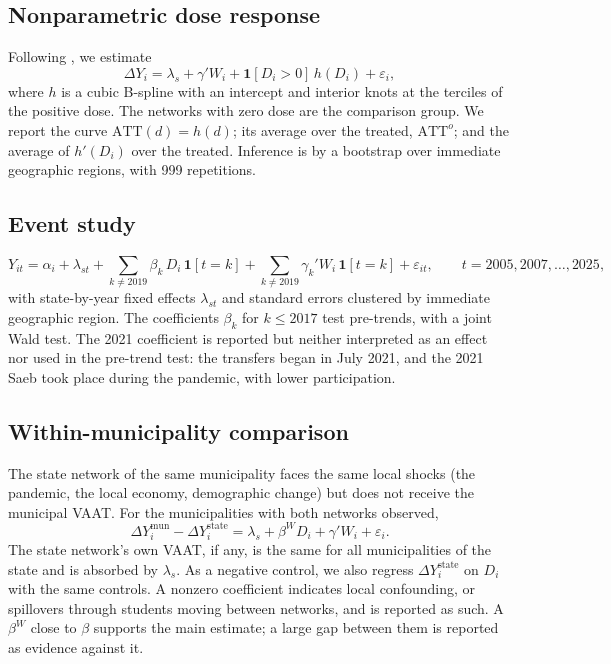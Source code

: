 \documentclass[11pt]{article}
\begin{document}
\subsection{Nonparametric dose response}\label{sec:dose}
Following \citet{callaway2024}, we estimate
\begin{equation}
\Delta Y_i = \lambda_s + \gamma' W_i + \mathbf{1}[D_i > 0]\, h(D_i) + \varepsilon_i ,
\end{equation}
where $h$ is a cubic B-spline with an intercept and interior knots at the terciles of the positive dose. The networks with zero dose are the comparison group. We report the curve $\text{ATT}(d) = h(d)$; its average over the treated, $\text{ATT}^o$; and the average of $h'(D_i)$ over the treated. Inference is by a bootstrap over immediate geographic regions, with 999 repetitions.

\subsection{Event study}
\begin{equation}
Y_{it} = \alpha_i + \lambda_{s t} + \sum_{k \neq 2019} \beta_k \, D_i \, \mathbf{1}[t = k] + \sum_{k \neq 2019} \gamma_k' W_i \, \mathbf{1}[t = k] + \varepsilon_{it}, \qquad t = 2005, 2007, \dots, 2025,
\end{equation}
with state-by-year fixed effects $\lambda_{st}$ and standard errors clustered by immediate geographic region. The coefficients $\beta_k$ for $k \le 2017$ test pre-trends, with a joint Wald test. The 2021 coefficient is reported but neither interpreted as an effect nor used in the pre-trend test: the transfers began in July 2021, and the 2021 Saeb took place during the pandemic, with lower participation.

\subsection{Within-municipality comparison}\label{sec:dentro}
The state network of the same municipality faces the same local shocks (the pandemic, the local economy, demographic change) but does not receive the municipal VAAT. For the municipalities with both networks observed,
\begin{equation}
\Delta Y^{\text{mun}}_i - \Delta Y^{\text{state}}_i = \lambda_s + \beta^{W} D_i + \gamma' W_i + \varepsilon_i .
\end{equation}
The state network's own VAAT, if any, is the same for all municipalities of the state and is absorbed by $\lambda_s$. As a negative control, we also regress $\Delta Y^{\text{state}}_i$ on $D_i$ with the same controls. A nonzero coefficient indicates local confounding, or spillovers through students moving between networks, and is reported as such. A $\beta^{W}$ close to $\beta$ supports the main estimate; a large gap between them is reported as evidence against it.
\end{document}
